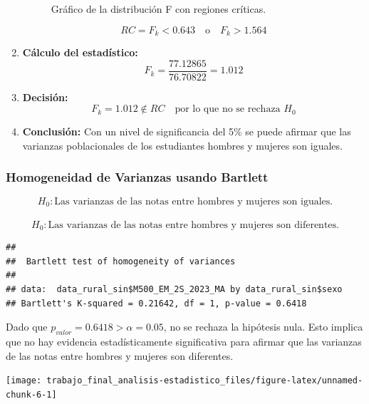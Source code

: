 \documentclass[
]{article}
\begin{document}
\begin{enumerate}
\begin{figure}[ht]
        \caption{Gráfico de la distribución F con regiones críticas.}
    \end{figure}  
   \[
    RC = F_k < 0.643 \quad \text{o} \quad F_k > 1.564
    \]

  \item \textbf{Cálculo del estadístico:}
    \[
    F_k = \frac{77.12865}{76.70822} = 1.012
    \]

  \item \textbf{Decisión:}
    \[
    F_k = 1.012 \notin RC \quad \text{por lo que no se rechaza } H_0
    \]

  \item \textbf{Conclusión:}
    Con un nivel de significancia del 5\% se puede afirmar que las varianzas poblacionales de los estudiantes hombres y mujeres son iguales.
\end{enumerate}

\subsubsection*{Homogeneidad de Varianzas usando
Bartlett}\label{homogeneidad-de-varianzas-usando-bartlett}

\[H_{0}: \text{Las varianzas de las notas entre hombres y mujeres son iguales.}\]\\
\[H_{0}: \text{Las varianzas de las notas entre hombres y mujeres son diferentes.}\]

\begin{verbatim}
## 
##  Bartlett test of homogeneity of variances
## 
## data:  data_rural_sin$M500_EM_2S_2023_MA by data_rural_sin$sexo
## Bartlett's K-squared = 0.21642, df = 1, p-value = 0.6418
\end{verbatim}

Dado que \(p_{valor}=0.6418>\alpha=0.05\), no se rechaza la hipótesis
nula. Esto implica que no hay evidencia estadísticamente significativa
para afirmar que las varianzas de las notas entre hombres y mujeres son
diferentes.

\begin{center}\texttt{[image: trabajo\_final\_analisis-estadistico\_files/figure-latex/unnamed-chunk-6-1]} \end{center}
\end{document}
